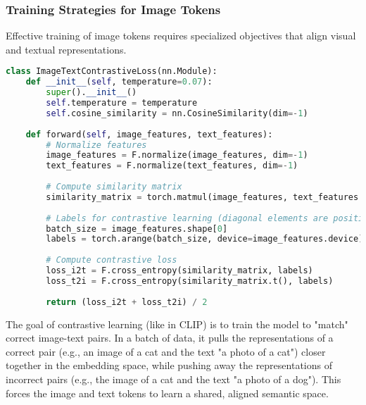 \subsubsection{Training Strategies for Image Tokens}

Effective training of image tokens requires specialized objectives that align visual and textual representations.

\begin{lstlisting}[language=Python, caption=Contrastive learning for image-text alignment]
class ImageTextContrastiveLoss(nn.Module):
    def __init__(self, temperature=0.07):
        super().__init__()
        self.temperature = temperature
        self.cosine_similarity = nn.CosineSimilarity(dim=-1)
    
    def forward(self, image_features, text_features):
        # Normalize features
        image_features = F.normalize(image_features, dim=-1)
        text_features = F.normalize(text_features, dim=-1)
        
        # Compute similarity matrix
        similarity_matrix = torch.matmul(image_features, text_features.t()) / self.temperature
        
        # Labels for contrastive learning (diagonal elements are positive pairs)
        batch_size = image_features.shape[0]
        labels = torch.arange(batch_size, device=image_features.device)
        
        # Compute contrastive loss
        loss_i2t = F.cross_entropy(similarity_matrix, labels)
        loss_t2i = F.cross_entropy(similarity_matrix.t(), labels)
        
        return (loss_i2t + loss_t2i) / 2
\end{lstlisting}

The goal of contrastive learning (like in CLIP) is to train the model to "match" correct image-text pairs. In a batch of data, it pulls the representations of a correct pair (e.g., an image of a cat and the text "a photo of a cat") closer together in the embedding space, while pushing away the representations of incorrect pairs (e.g., the image of a cat and the text "a photo of a dog"). This forces the image and text tokens to learn a shared, aligned semantic space.

